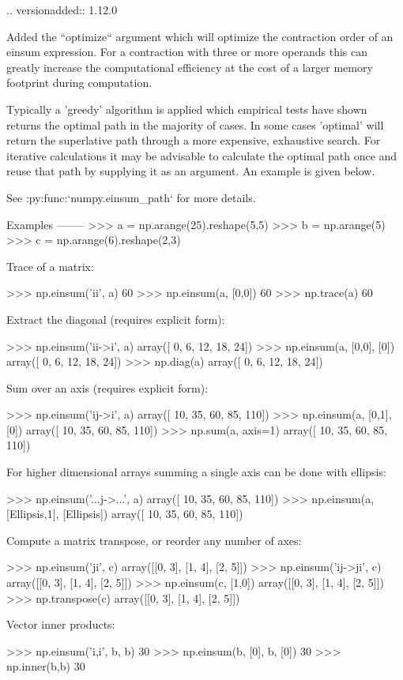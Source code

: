 \begin{DoxyVerb}
.. versionadded:: 1.12.0

Added the ``optimize`` argument which will optimize the contraction order
of an einsum expression. For a contraction with three or more operands this
can greatly increase the computational efficiency at the cost of a larger
memory footprint during computation.

Typically a 'greedy' algorithm is applied which empirical tests have shown
returns the optimal path in the majority of cases. In some cases 'optimal'
will return the superlative path through a more expensive, exhaustive search.
For iterative calculations it may be advisable to calculate the optimal path
once and reuse that path by supplying it as an argument. An example is given
below.

See :py:func:`numpy.einsum_path` for more details.

Examples
--------
>>> a = np.arange(25).reshape(5,5)
>>> b = np.arange(5)
>>> c = np.arange(6).reshape(2,3)

Trace of a matrix:

>>> np.einsum('ii', a)
60
>>> np.einsum(a, [0,0])
60
>>> np.trace(a)
60

Extract the diagonal (requires explicit form):

>>> np.einsum('ii->i', a)
array([ 0,  6, 12, 18, 24])
>>> np.einsum(a, [0,0], [0])
array([ 0,  6, 12, 18, 24])
>>> np.diag(a)
array([ 0,  6, 12, 18, 24])

Sum over an axis (requires explicit form):

>>> np.einsum('ij->i', a)
array([ 10,  35,  60,  85, 110])
>>> np.einsum(a, [0,1], [0])
array([ 10,  35,  60,  85, 110])
>>> np.sum(a, axis=1)
array([ 10,  35,  60,  85, 110])

For higher dimensional arrays summing a single axis can be done with ellipsis:

>>> np.einsum('...j->...', a)
array([ 10,  35,  60,  85, 110])
>>> np.einsum(a, [Ellipsis,1], [Ellipsis])
array([ 10,  35,  60,  85, 110])

Compute a matrix transpose, or reorder any number of axes:

>>> np.einsum('ji', c)
array([[0, 3],
       [1, 4],
       [2, 5]])
>>> np.einsum('ij->ji', c)
array([[0, 3],
       [1, 4],
       [2, 5]])
>>> np.einsum(c, [1,0])
array([[0, 3],
       [1, 4],
       [2, 5]])
>>> np.transpose(c)
array([[0, 3],
       [1, 4],
       [2, 5]])

Vector inner products:

>>> np.einsum('i,i', b, b)
30
>>> np.einsum(b, [0], b, [0])
30
>>> np.inner(b,b)
30


\end{DoxyVerb}
